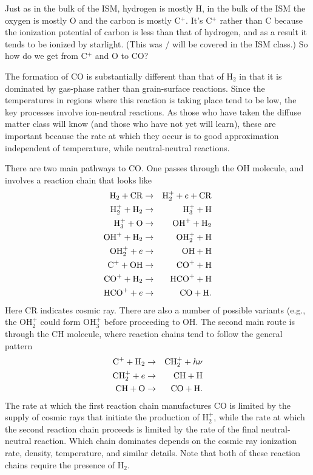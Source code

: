 Just as in the bulk of the ISM, hydrogen is mostly H, in the bulk of the ISM the oxygen is mostly O and the carbon is mostly C$^+$. It's C$^+$ rather than C because the ionization potential of carbon is less than that of hydrogen, and as a result it tends to be ionized by starlight. (This was / will be covered in the ISM class.) So how do we get from C$^+$ and O to CO?

The formation of CO is substantially different than that of H$_2$ in that it is dominated by gas-phase rather than grain-surface reactions. Since the temperatures in regions where this reaction is taking place tend to be low, the key processes involve ion-neutral reactions. As those who have taken the diffuse matter class will know (and those who have not yet will learn), these are important because the rate at which they occur is to good approximation independent of temperature, while neutral-neutral reactions.

There are two main pathways to CO. One passes through the OH molecule, and involves a reaction chain that looks like
\begin{eqnarray}
{\rm H}_2 + {\rm CR} & \rightarrow & {\rm H}_2^+ + e + {\rm CR} \\
{\rm H}_2^+ + {\rm H}_2 & \rightarrow & {\rm H}_3^+ + {\rm H} \\
{\rm H}_3^+ + {\rm O} & \rightarrow & {\rm OH}^+ + {\rm H}_2 \\
{\rm OH}^+ + {\rm H}_2 & \rightarrow & {\rm OH}_2^+ + {\rm H} \\
{\rm OH}_2^+ + e & \rightarrow & {\rm OH} + {\rm H} \\
{\rm C}^+ + {\rm OH} & \rightarrow & {\rm CO}^+ + {\rm H} \\
{\rm CO}^+ + {\rm H}_2 & \rightarrow & {\rm HCO}^+ + {\rm H} \\
{\rm HCO}^+ + e & \rightarrow & {\rm CO} + {\rm H}.
\end{eqnarray}
Here CR indicates cosmic ray. There are also a number of possible variants (e.g., the OH$_2^+$ could form OH$_3^+$ before proceeding to OH. The second main route is through the CH molecule, where reaction chains tend to follow the general pattern
\begin{eqnarray}
{\rm C}^+ + {\rm H}_2 & \rightarrow & {\rm CH}_2^+ + h\nu \\
{\rm CH}_2^+ + e & \rightarrow & {\rm CH} + {\rm H} \\
{\rm CH} + {\rm O} & \rightarrow & {\rm CO} + {\rm H}.
\end{eqnarray}
The rate at which the first reaction chain manufactures CO is limited by the supply of cosmic rays that initiate the production of H$_2^+$, while the rate at which the second reaction chain proceeds is limited by the rate of the final neutral-neutral reaction. Which chain dominates depends on the cosmic ray ionization rate, density, temperature, and similar details. Note that both of these reaction chains require the presence of H$_2$. 

